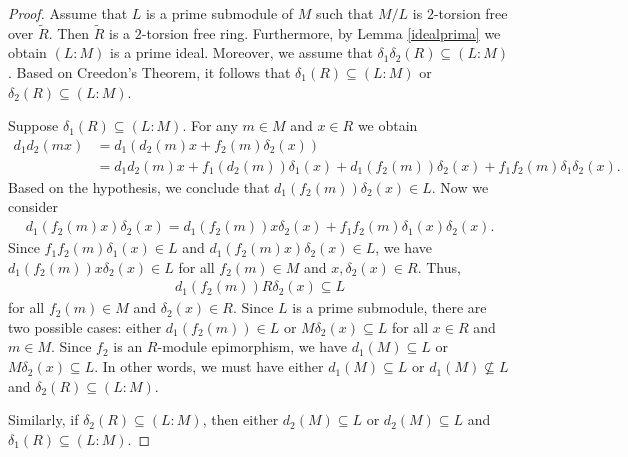 \documentclass{arxiv}
\begin{document}
\begin{proof}
    Assume that $L$ is a prime submodule of $M$ such that $M/L$ is $2$-torsion free over $\tilde{R}$. Then $\tilde{R}$ is a $2$-torsion free ring. Furthermore, by Lemma \ref{idealprima} we obtain $(L:M)$ is a prime ideal. Moreover, we assume that $\delta_1\delta_2(R)\subseteq (L:M)$. Based on Creedon's Theorem, it follows that $\delta_1(R) \subseteq (L:M)$ or $\delta_2(R) \subseteq (L:M)$.

    Suppose $\delta_1(R)\subseteq (L:M)$. For any $m \in M$ and $x \in R$ we obtain
    \begin{align*}
        d_1d_2(mx)&= d_1(d_2(m)x+f_2(m)\delta_2(x))\\
        &= d_1d_2(m)x+f_1(d_2(m))\delta_1(x)+d_1(f_2(m))\delta_2(x)+f_1f_2(m)\delta_1\delta_2(x).
    \end{align*}
    Based on the hypothesis, we conclude that $d_1(f_2(m))\delta_2(x) \in L$. Now we consider 
    \begin{align*}
        d_1(f_2(m)x)\delta_2(x) = d_1(f_2(m))x\delta_2(x) + f_1f_2(m)\delta_1(x)\delta_2(x).
    \end{align*}
    Since $f_1f_2(m)\delta_1(x) \in L$ and $d_1(f_2(m)x)\delta_2(x) \in L$, we have $d_1(f_2(m))x\delta_2(x) \in L$ for all $f_2(m)\in M$ and $x, \delta_2(x) \in R$. Thus, 
    \begin{align*}
        d_1(f_2(m))R\delta_2(x) \subseteq L
    \end{align*}
    for all $f_2(m)\in M$ and $\delta_2(x) \in R$. Since $L$ is a prime submodule, there are two possible cases: either $d_1(f_2(m)) \in L$ or  $M\delta_2(x) \subseteq L$ for all $x \in R$ and $m \in M$. Since $f_2$ is an $R$-module epimorphism, we have $d_1(M)\subseteq L$ or  $M\delta_2(x) \subseteq L$. In other words, we must have either $d_1(M)\subseteq L$ or  $d_1(M)\nsubseteq L$ and $\delta_2(R) \subseteq (L:M)$.

    Similarly, if $\delta_2(R)\subseteq (L:M)$, then either $d_2(M)\subseteq L$ or $d_2(M)\subseteq L$ and $\delta_1(R) \subseteq (L:M)$.
\end{proof}
\end{document}

